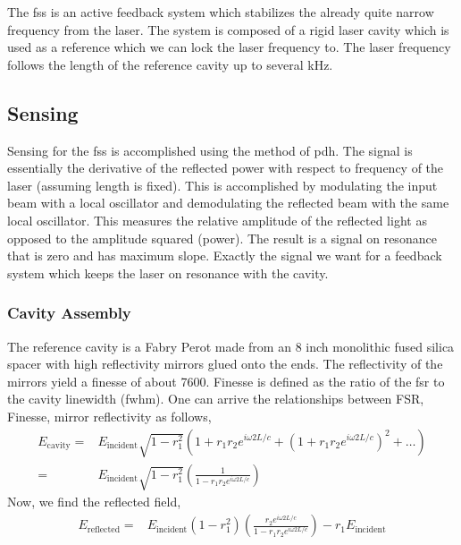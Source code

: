 The \ac{fss} is an active feedback system which stabilizes the already quite
narrow frequency from the laser. The system is composed of a rigid laser cavity
which is used as a reference which we can lock the laser frequency to. The
laser frequency follows the length of the reference cavity up to several kHz.

\subsection{Sensing}

Sensing for the \ac{fss} is accomplished using the method of \ac{pdh}. The
signal is essentially the derivative of the reflected power with respect to
frequency of the laser (assuming length is fixed). This is accomplished by
modulating the input beam with a local oscillator and demodulating the
reflected beam with the same local oscillator. This measures the relative
amplitude of the reflected light as opposed to the amplitude squared (power).
The result is a signal on resonance that is zero and has maximum slope.
Exactly the signal we want for a feedback system which keeps the laser on
resonance with the cavity.

\subsubsection{Cavity Assembly}

The reference cavity is a Fabry Perot made from an 8 inch monolithic fused silica
spacer with high reflectivity mirrors glued onto the ends. The reflectivity
of the mirrors yield a finesse of about 7600. Finesse is defined as the ratio
of the \ac{fsr} to the cavity linewidth (\ac{fwhm}). One can arrive the
relationships between FSR, Finesse, mirror reflectivity as follows,
\begin{align}
E_{\mathrm{cavity}} =& E_{\mathrm{incident}} \sqrt{1-r_1^2} \left( 1 + r_1 r_2
    e^{i \omega 2 L /c} + \left(1+r_1 r_2 e^{i \omega 2L/c} \right)^2 + \ldots \right)
    \\
=& E_{\mathrm{incident}} \sqrt{1-r_1^2} \left( \frac{1}{1 - r_1 r_2
    e^{i \omega 2L/c}} \right)
\end{align}
Now, we find the reflected field,
\begin{align}
E_{\mathrm{reflected}} =& E_{\mathrm{incident}} \left( 1-r_1^2 \right)
    \left( \frac{r_2 e^{i \omega 2L/c}}{1 - r_1 r_2 e^{i \omega 2L/c}} \right)
    - r_1 E_{\mathrm{incident}}
\end{align}

